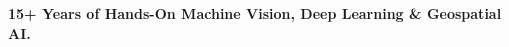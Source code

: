 \onehalfspace
\textbf{\large 15+ Years of Hands-On Machine Vision, Deep Learning \& Geospatial AI.}
\singlespace

\vspace{0.8cm}
